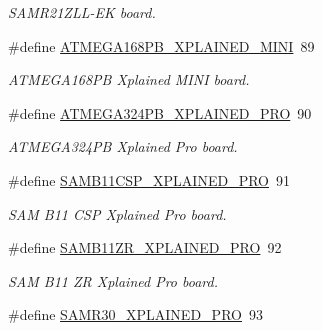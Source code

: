 \begin{DoxyCompactItemize}
\begin{DoxyCompactList}\small\item\em S\+A\+M\+R21\+Z\+L\+L-\/\+E\+K board. \end{DoxyCompactList}\item 
\hypertarget{group__group__common__boards_ga4648060c3a8ed08e6a227f2b1fe3bd80}{}\#define \hyperlink{group__group__common__boards_ga4648060c3a8ed08e6a227f2b1fe3bd80}{A\+T\+M\+E\+G\+A168\+P\+B\+\_\+\+X\+P\+L\+A\+I\+N\+E\+D\+\_\+\+M\+I\+N\+I}~89\label{group__group__common__boards_ga4648060c3a8ed08e6a227f2b1fe3bd80}

\begin{DoxyCompactList}\small\item\em A\+T\+M\+E\+G\+A168\+P\+B Xplained M\+I\+N\+I board. \end{DoxyCompactList}\item 
\hypertarget{group__group__common__boards_ga2269729f56fe6fbac557d1104f85ed9c}{}\#define \hyperlink{group__group__common__boards_ga2269729f56fe6fbac557d1104f85ed9c}{A\+T\+M\+E\+G\+A324\+P\+B\+\_\+\+X\+P\+L\+A\+I\+N\+E\+D\+\_\+\+P\+R\+O}~90\label{group__group__common__boards_ga2269729f56fe6fbac557d1104f85ed9c}

\begin{DoxyCompactList}\small\item\em A\+T\+M\+E\+G\+A324\+P\+B Xplained Pro board. \end{DoxyCompactList}\item 
\hypertarget{group__group__common__boards_ga5d5ed3a0591e9ce0f5752f2258b6adea}{}\#define \hyperlink{group__group__common__boards_ga5d5ed3a0591e9ce0f5752f2258b6adea}{S\+A\+M\+B11\+C\+S\+P\+\_\+\+X\+P\+L\+A\+I\+N\+E\+D\+\_\+\+P\+R\+O}~91\label{group__group__common__boards_ga5d5ed3a0591e9ce0f5752f2258b6adea}

\begin{DoxyCompactList}\small\item\em S\+A\+M B11 C\+S\+P Xplained Pro board. \end{DoxyCompactList}\item 
\hypertarget{group__group__common__boards_ga2d39842a107a4167ecb83defbf24e7c2}{}\#define \hyperlink{group__group__common__boards_ga2d39842a107a4167ecb83defbf24e7c2}{S\+A\+M\+B11\+Z\+R\+\_\+\+X\+P\+L\+A\+I\+N\+E\+D\+\_\+\+P\+R\+O}~92\label{group__group__common__boards_ga2d39842a107a4167ecb83defbf24e7c2}

\begin{DoxyCompactList}\small\item\em S\+A\+M B11 Z\+R Xplained Pro board. \end{DoxyCompactList}\item 
\hypertarget{group__group__common__boards_ga2b7f84db63d05656cea0ad59e796c108}{}\#define \hyperlink{group__group__common__boards_ga2b7f84db63d05656cea0ad59e796c108}{S\+A\+M\+R30\+\_\+\+X\+P\+L\+A\+I\+N\+E\+D\+\_\+\+P\+R\+O}~93\label{group__group__common__boards_ga2b7f84db63d05656cea0ad59e796c108}


\end{DoxyCompactItemize}
